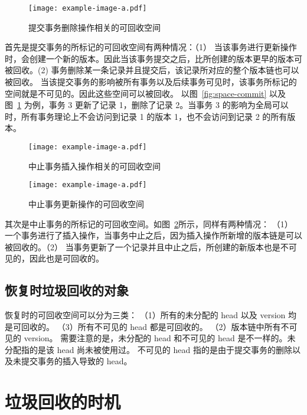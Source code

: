 \begin{figure}
    \centering
    \texttt{[image: example-image-a.pdf]}
    \caption{提交事务删除操作相关的可回收空间}
    \label{fig:space-commit2}
\end{figure}

首先是提交事务的所标记的可回收空间有两种情况：（1） 当该事务进行更新操作时，会创建一个新的版本。因此当该事务提交之后，比所创建的版本更早的版本可被回收。(2) 事务删除某一条记录并且提交后，该记录所对应的整个版本链也可以被回收。 当该提交事务的影响被所有事务以及后续事务可见时，该事务所标记的空间就是不可见的。因此这些空间可以被回收。
以图~\ref{fig:space-commit} 以及图~\ref{fig:space-commit2} 为例，事务 3 更新了记录 1，删除了记录 2。当事务 3 的影响为全局可以时，所有事务理论上不会访问到记录 1 的版本 1，也不会访问到记录 2 的所有版本。

\begin{figure}
    \centering
    \texttt{[image: example-image-a.pdf]}
    \caption{中止事务插入操作相关的可回收空间}
    \label{fig:space-abort}
\end{figure}

\begin{figure}
    \centering
    \texttt{[image: example-image-a.pdf]}
    \caption{中止事务更新操作的可回收空间}
    \label{fig:space-abort2}
\end{figure}

其次是中止事务的所标记的可回收空间。如图~\ref{fig:space-abort}所示，同样有两种情况：
（1） 一个事务进行了插入操作，当事务中止之后，因为插入操作所新增的版本链是可以被回收的。（2） 当事务更新了一个记录并且中止之后，所创建的新版本也是不可见的，因此也是可回收的。

\subsection{恢复时垃圾回收的对象}

恢复时的可回收空间可以分为三类：
（1）所有的未分配的 head 以及 version 均是可回收的。
（3）所有不可见的 head 都是可回收的。
（2）版本链中所有不可见的 version。
需要注意的是，未分配的 head 和不可见的 head 是不一样的。未分配指的是该 head 尚未被使用过。
不可见的 head 指的是由于提交事务的删除以及未提交事务的插入导致的 head。


\section{垃圾回收的时机}
\label{sec:time}

